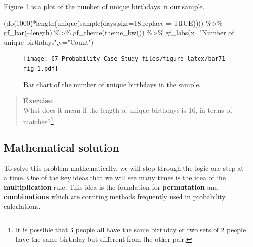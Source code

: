\documentclass[
]{book}
\newenvironment{Shaded}{\begin{snugshade}}{\end{snugshade}}
\newcommand{\AttributeTok}[1]{\textcolor[rgb]{0.77,0.63,0.00}{#1}}
\newcommand{\ConstantTok}[1]{\textcolor[rgb]{0.00,0.00,0.00}{#1}}
\newcommand{\DecValTok}[1]{\textcolor[rgb]{0.00,0.00,0.81}{#1}}
\newcommand{\FunctionTok}[1]{\textcolor[rgb]{0.00,0.00,0.00}{#1}}
\newcommand{\NormalTok}[1]{#1}
\newcommand{\SpecialCharTok}[1]{\textcolor[rgb]{0.00,0.00,0.00}{#1}}
\newcommand{\StringTok}[1]{\textcolor[rgb]{0.31,0.60,0.02}{#1}}
\begin{document}
Figure \ref{fig:bar71-fig} is a plot of the number of unique birthdays in our sample.

\begin{Shaded}
\begin{Highlighting}[]
\NormalTok{(}\FunctionTok{do}\NormalTok{(}\DecValTok{1000}\NormalTok{)}\SpecialCharTok{*}\FunctionTok{length}\NormalTok{(}\FunctionTok{unique}\NormalTok{(}\FunctionTok{sample}\NormalTok{(days,}\AttributeTok{size=}\DecValTok{18}\NormalTok{,}\AttributeTok{replace =} \ConstantTok{TRUE}\NormalTok{)))) }\SpecialCharTok{\%\textgreater{}\%}
  \FunctionTok{gf\_bar}\NormalTok{(}\SpecialCharTok{\textasciitilde{}}\NormalTok{length) }\SpecialCharTok{\%\textgreater{}\%}
  \FunctionTok{gf\_theme}\NormalTok{(}\FunctionTok{theme\_bw}\NormalTok{()) }\SpecialCharTok{\%\textgreater{}\%}
  \FunctionTok{gf\_labs}\NormalTok{(}\AttributeTok{x=}\StringTok{"Number of unique birthdays"}\NormalTok{,}\AttributeTok{y=}\StringTok{"Count"}\NormalTok{)}
\end{Highlighting}
\end{Shaded}

\begin{figure}
\centering
\texttt{[image: 07-Probability-Case-Study\_files/figure-latex/bar71-fig-1.pdf]}
\caption{\label{fig:bar71-fig}Bar chart of the number of unique birthdays in the sample.}
\end{figure}

\begin{quote}
\textbf{Exercise}:\\
What does it mean if the length of unique birthdays is 16, in terms of matches?\footnote{It is possible that 3 people all have the same birthday or two sets of 2 people have the same birthday but different from the other pair.}
\end{quote}

\hypertarget{mathematical-solution}{%
\subsection{Mathematical solution}\label{mathematical-solution}}

To solve this problem mathematically, we will step through the logic one step at a time. One of the key ideas that we will see many times is the idea of the \textbf{multiplication} rule. This idea is the foundation for \textbf{permutation} and \textbf{combinations} which are counting methods frequently used in probability calculations.
\end{document}
